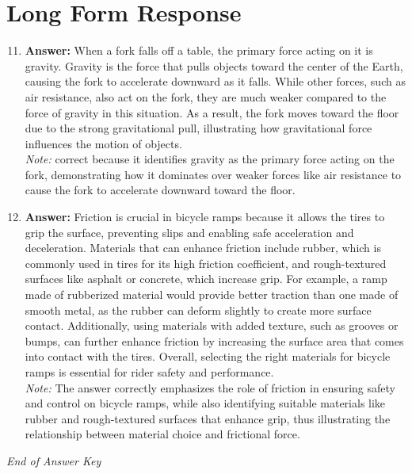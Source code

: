\documentclass[12pt]{article}
\begin{document}
\section*{Long Form Response}
\begin{enumerate}[label=\arabic*.]
\setcounter{enumi}{10}
\item \textbf{Answer:} When a fork falls off a table, the primary force acting on it is gravity. Gravity is the force that pulls objects toward the center of the Earth, causing the fork to accelerate downward as it falls. While other forces, such as air resistance, also act on the fork, they are much weaker compared to the force of gravity in this situation. As a result, the fork moves toward the floor due to the strong gravitational pull, illustrating how gravitational force influences the motion of objects.
\\ \textit{Note:} correct because it identifies gravity as the primary force acting on the fork, demonstrating how it dominates over weaker forces like air resistance to cause the fork to accelerate downward toward the floor.
\item \textbf{Answer:} Friction is crucial in bicycle ramps because it allows the tires to grip the surface, preventing slips and enabling safe acceleration and deceleration. Materials that can enhance friction include rubber, which is commonly used in tires for its high friction coefficient, and rough-textured surfaces like asphalt or concrete, which increase grip. For example, a ramp made of rubberized material would provide better traction than one made of smooth metal, as the rubber can deform slightly to create more surface contact. Additionally, using materials with added texture, such as grooves or bumps, can further enhance friction by increasing the surface area that comes into contact with the tires. Overall, selecting the right materials for bicycle ramps is essential for rider safety and performance.
\\ \textit{Note:} The answer correctly emphasizes the role of friction in ensuring safety and control on bicycle ramps, while also identifying suitable materials like rubber and rough-textured surfaces that enhance grip, thus illustrating the relationship between material choice and frictional force.
\end{enumerate}

\vfill
\noindent\textit{End of Answer Key}
\end{document}
